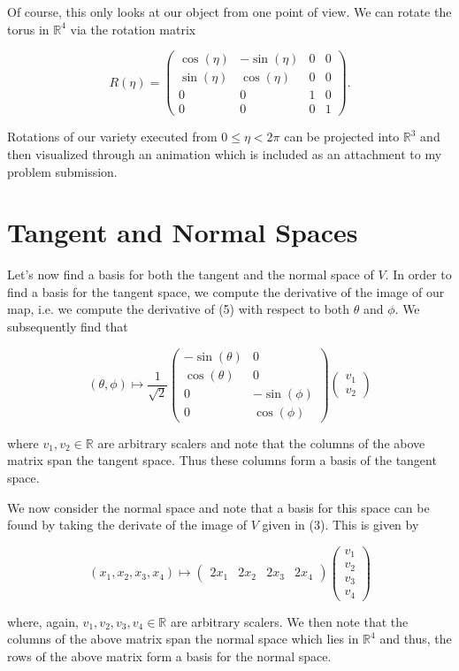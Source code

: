 \documentclass{article}
\newcommand{\be}{\begin{equation}}
\newcommand{\ee}{\end{equation}}
\newcommand{\pmm}{\begin{pmatrix}}
\newcommand{\epm}{\end{pmatrix}}
\newcommand{\real}{\mathbb{R}}
\newcommand{\tb}{\hspace{0.5cm}}
\begin{document}
\tb Of course, this only looks at our object from one point of view. We can rotate the torus in $\real^4$ via the rotation matrix 

\be
	R(\eta) = \pmm \cos(\eta) & -\sin(\eta) & 0 & 0 \\ \sin(\eta) & \cos(\eta) & 0 & 0 \\ 0 & 0 & 1 & 0 \\ 0 & 0 & 0 & 1 \epm. 
\ee

Rotations of our variety executed from $0 \le \eta < 2\pi$ can be projected into $\real^3$ and then visualized through an animation which is included as an attachment to my problem submission. 

\section*{Tangent and Normal Spaces}

\tb Let's now find a basis for both the tangent and the normal space of $V$. In order to find a basis for the tangent space, we compute the derivative of the image of our map, i.e. we compute the derivative of (5) with respect to both $\theta$ and $\phi$. We subsequently find that 

\be
(\theta, \phi) \mapsto \frac{1}{\sqrt{2}} 
					\pmm 
					-\sin(\theta) & 0 \\
					\cos(\theta) & 0 \\
					0 & -\sin(\phi) \\
					0 & \cos(\phi)
					\epm
					\pmm
					v_1 \\
					v_2
					\epm
\ee

where $v_1, v_2 \in \real$ are arbitrary scalers and note that the columns of the above matrix span the tangent space. Thus these columns form a basis of the tangent space. \par

\tb We now consider the normal space and note that a basis for this space can be found by taking the derivate of the image of $V$ given in (3). This is given by 

\be
(x_1, x_2, x_3, x_4) \mapsto \pmm 2x_1 & 2x_2 & 2x_3 & 2x_4 \epm \pmm v_1 \\ v_2 \\ v_3 \\ v_4 \epm
\ee

where, again, $v_1, v_2, v_3, v_4 \in \real$ are arbitrary scalers. We then note that the columns of the above matrix span the normal space which lies in $\real^4$ and thus, the rows of the above matrix form a basis for the normal space. 
\end{document}
